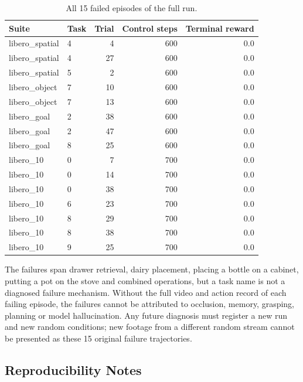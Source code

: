 \begin{table}[H]
  \centering
  \small
  \caption{All 15 failed episodes of the full run.}
  \label{tab:owa-failures}
  \begin{tabular}{@{}llrrr@{}}
    \toprule
    Suite & Task & Trial & Control steps & Terminal reward \\
    \midrule
    libero\_spatial & 4 & 4  & 600 & 0.0 \\
    libero\_spatial & 4 & 27 & 600 & 0.0 \\
    libero\_spatial & 5 & 2  & 600 & 0.0 \\
    libero\_object  & 7 & 10 & 600 & 0.0 \\
    libero\_object  & 7 & 13 & 600 & 0.0 \\
    libero\_goal    & 2 & 38 & 600 & 0.0 \\
    libero\_goal    & 2 & 47 & 600 & 0.0 \\
    libero\_goal    & 8 & 25 & 600 & 0.0 \\
    libero\_10      & 0 & 7  & 700 & 0.0 \\
    libero\_10      & 0 & 14 & 700 & 0.0 \\
    libero\_10      & 0 & 38 & 700 & 0.0 \\
    libero\_10      & 6 & 23 & 700 & 0.0 \\
    libero\_10      & 8 & 29 & 700 & 0.0 \\
    libero\_10      & 8 & 38 & 700 & 0.0 \\
    libero\_10      & 9 & 25 & 700 & 0.0 \\
    \bottomrule
  \end{tabular}
\end{table}

The failures span drawer retrieval, dairy placement, placing a bottle on a
cabinet, putting a pot on the stove and combined operations, but a task name is
not a diagnosed failure mechanism. Without the full video and action record of
each failing episode, the failures cannot be attributed to occlusion, memory,
grasping, planning or model hallucination. Any future diagnosis must register a
new run and new random conditions; new footage from a different random stream
cannot be presented as these 15 original failure trajectories.

\subsection{Reproducibility Notes}
\label{sec:owa-issues}

